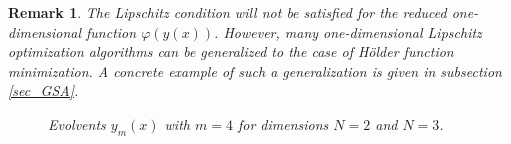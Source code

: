 \documentclass[iicol]{sn-jnl}
\theoremstyle{thmstyleone}%
\theoremstyle{thmstyletwo}%
\newtheorem{remark}{Remark}%
\theoremstyle{thmstylethree}%
\begin{document}
\begin{remark}
The Lipschitz condition will not be satisfied for the reduced one-dimensional function $\varphi(y(x))$. However, many one-dimensional Lipschitz optimization algorithms can be generalized to the case of H{\"o}lder function minimization. A concrete example of such a generalization is given in subsection \ref{sec_GSA}.

\begin{figure}
\center
\begin{minipage}{0.45\linewidth}
\end{minipage}
\begin{minipage}{0.45\linewidth}
\end{minipage}
\caption{Evolvents $y_m(x)$ with $m=4$ for dimensions $N=2$ and $N=3$.}\label{fig:Peano}
\end{figure}   
\end{remark}
\end{document}
